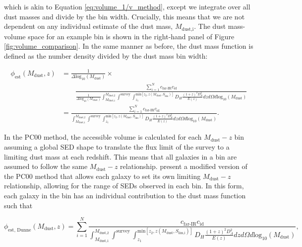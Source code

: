 \noindent which is akin to Equation \ref{eq:volume_1/v_method}, except we integrate over all dust masses and divide by the bin width. Crucially, this means that we are not dependent on any individual estimate of the dust mass, $M_{\textrm{dust,i}}$. The dust mass-volume space for an example bin is shown in the right-hand panel of Figure \ref{fig:volume_comparison}. In the same manner as before, the dust mass function is defined as the number density divided by the dust mass bin width:

\begin{align}
    \phi_{\textrm{est}}(M_{\textrm{dust}},z) &= \frac{1}{\Delta \textrm{log}_{10}(M_{\textrm{dust}})} \times \nonumber \\
    & \qquad \frac{\sum_{i=1}^N c_{\scriptscriptstyle \textrm{far-IR}} c_{\scriptscriptstyle \textrm{id}}}{\frac{1}{\Delta \textrm{log}_{10}(M_\textrm{dust})}\int_{\scriptscriptstyle M_{\textrm{dust,1}}}^{\scriptscriptstyle M_{\textrm{dust,2}}} \int^{\scriptscriptstyle \textrm{survey}} \int_{\scriptscriptstyle z_1}^{\scriptscriptstyle \textrm{min}[z_2, z(M_{\textrm{dust}},S_{\textrm{lim}})]} D_H \frac{(1+z)^2 D_A^2}{E(z)} dz d\Omega d\textrm{log}_{10}(M_\textrm{dust})} \nonumber \\
    &= \frac{\sum_{i=1}^N c_{\scriptscriptstyle \textrm{far-IR}} c_{\scriptscriptstyle \textrm{id}}}{\int_{\scriptscriptstyle M_{\textrm{dust,1}}}^{\scriptscriptstyle M_{\textrm{dust,2}}} \int^{\scriptscriptstyle \textrm{survey}} \int_{\scriptscriptstyle z_1}^{\scriptscriptstyle \textrm{min}[z_2, z(M_{\textrm{dust}},S_{\textrm{lim}})]} D_H \frac{(1+z)^2 D_A^2}{E(z)} dz d\Omega d\textrm{log}_{10}(M_\textrm{dust})}.
\label{eq:phi_pc00_method}
\end{align}

In the PC00 method, the accessible volume is calculated for each $M_{\textrm{dust}} - z$ bin assuming a global SED shape to translate the flux limit of the survey to a limiting dust mass at each redshift. This means that all galaxies in a bin are assumed to follow the same $M_{\textrm{dust}} - z$ relationship. \citealt{Dunne_2011} present a modified version of the PC00 method that allows each galaxy to set its own limiting $M_{\textrm{dust}} - z$ relationship, allowing for the range of SEDs observed in each bin. In this form, each galaxy in the bin has an individual contribution to the dust mass function such that

\begin{equation}
    \phi_{\textrm{est, Dunne}}(M_{\textrm{dust}},z) = \sum_{i=1}^N \frac{c_{\scriptscriptstyle \textrm{far-IR}} c_{\scriptscriptstyle \textrm{id}}}{\int_{\scriptscriptstyle M_{\textrm{dust,1}}}^{\scriptscriptstyle M_{\textrm{dust,2}}} \int^{\scriptscriptstyle \textrm{survey}} \int_{\scriptscriptstyle z_1}^{\scriptscriptstyle \textrm{min}[z_2, z(M_{\textrm{dust}},S_{\textrm{lim,i}})]} D_H \frac{(1+z)^2 D_A^2}{E(z)} dz d\Omega d\textrm{log}_{10}(M_\textrm{dust})},
\label{eq:phi_pc00_dunne_method}
\end{equation}

